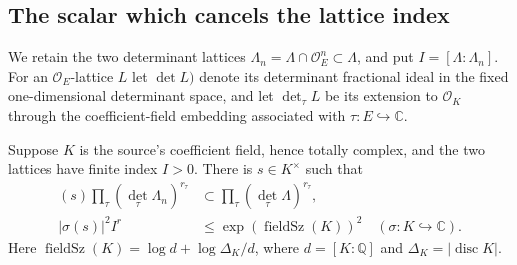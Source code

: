 \subsection{The scalar which cancels the lattice index}
\label{subsec:ftb-reflex-small-scalar}

We retain the two determinant lattices
\(\Lambda_n=\Lambda\cap\mathcal O_E^n\subset\Lambda\), and put
\(I=[\Lambda:\Lambda_n]\).  For an \(\mathcal O_E\)-lattice \(L\)
let \(\det L)\) denote its determinant fractional ideal in the fixed
one-dimensional determinant space, and let \(\det_\tau L\) be its
extension to \(\mathcal O_K\) through the coefficient-field embedding
associated with \(\tau:E\hookrightarrow\mathbb C\).

\begin{srlemma}
\label{lem:ftb-reflex-small-scalar}
Suppose \(K\) is the source's coefficient field, hence totally complex,
and the two lattices have finite index \(I>0\).
There is \(s\in K^\times\) such that
\begin{align}
 (s)\prod_\tau(\det_\tau\Lambda_n)^{r_\tau}
       &\subset\prod_\tau(\det_\tau\Lambda)^{r_\tau},
                  \label{eq:ftb-scalar-ideal}\\
 |\sigma(s)|^2 I^r
       &\le\exp(\operatorname{fieldSz}(K))^2
         \quad(\sigma:K\hookrightarrow\mathbb C).
                  \label{eq:ftb-scalar-index}
\end{align}
Here
\(\operatorname{fieldSz}(K)=\log d+\log\Delta_K/d\), where
\(d=[K:\mathbb Q]\) and \(\Delta_K=|\operatorname{disc}K|\).
\end{srlemma}
